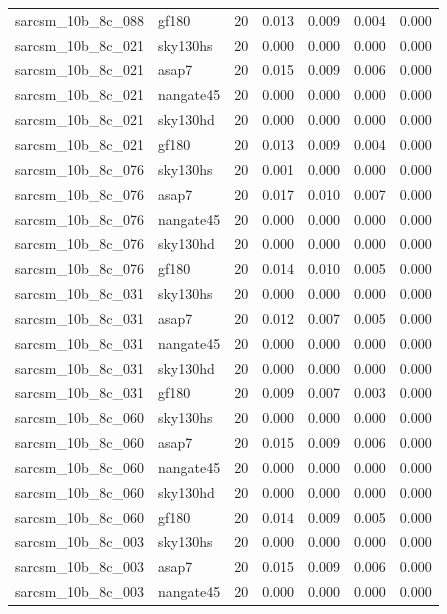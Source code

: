 \begin{tabular}{llrrrrr}
sarcsm\_10b\_8c\_088 & gf180 & 20 & 0.013 & 0.009 & 0.004 & 0.000 \\
sarcsm\_10b\_8c\_021 & sky130hs & 20 & 0.000 & 0.000 & 0.000 & 0.000 \\
sarcsm\_10b\_8c\_021 & asap7 & 20 & 0.015 & 0.009 & 0.006 & 0.000 \\
sarcsm\_10b\_8c\_021 & nangate45 & 20 & 0.000 & 0.000 & 0.000 & 0.000 \\
sarcsm\_10b\_8c\_021 & sky130hd & 20 & 0.000 & 0.000 & 0.000 & 0.000 \\
sarcsm\_10b\_8c\_021 & gf180 & 20 & 0.013 & 0.009 & 0.004 & 0.000 \\
sarcsm\_10b\_8c\_076 & sky130hs & 20 & 0.001 & 0.000 & 0.000 & 0.000 \\
sarcsm\_10b\_8c\_076 & asap7 & 20 & 0.017 & 0.010 & 0.007 & 0.000 \\
sarcsm\_10b\_8c\_076 & nangate45 & 20 & 0.000 & 0.000 & 0.000 & 0.000 \\
sarcsm\_10b\_8c\_076 & sky130hd & 20 & 0.000 & 0.000 & 0.000 & 0.000 \\
sarcsm\_10b\_8c\_076 & gf180 & 20 & 0.014 & 0.010 & 0.005 & 0.000 \\
sarcsm\_10b\_8c\_031 & sky130hs & 20 & 0.000 & 0.000 & 0.000 & 0.000 \\
sarcsm\_10b\_8c\_031 & asap7 & 20 & 0.012 & 0.007 & 0.005 & 0.000 \\
sarcsm\_10b\_8c\_031 & nangate45 & 20 & 0.000 & 0.000 & 0.000 & 0.000 \\
sarcsm\_10b\_8c\_031 & sky130hd & 20 & 0.000 & 0.000 & 0.000 & 0.000 \\
sarcsm\_10b\_8c\_031 & gf180 & 20 & 0.009 & 0.007 & 0.003 & 0.000 \\
sarcsm\_10b\_8c\_060 & sky130hs & 20 & 0.000 & 0.000 & 0.000 & 0.000 \\
sarcsm\_10b\_8c\_060 & asap7 & 20 & 0.015 & 0.009 & 0.006 & 0.000 \\
sarcsm\_10b\_8c\_060 & nangate45 & 20 & 0.000 & 0.000 & 0.000 & 0.000 \\
sarcsm\_10b\_8c\_060 & sky130hd & 20 & 0.000 & 0.000 & 0.000 & 0.000 \\
sarcsm\_10b\_8c\_060 & gf180 & 20 & 0.014 & 0.009 & 0.005 & 0.000 \\
sarcsm\_10b\_8c\_003 & sky130hs & 20 & 0.000 & 0.000 & 0.000 & 0.000 \\
sarcsm\_10b\_8c\_003 & asap7 & 20 & 0.015 & 0.009 & 0.006 & 0.000 \\
sarcsm\_10b\_8c\_003 & nangate45 & 20 & 0.000 & 0.000 & 0.000 & 0.000 \\

\end{tabular}
